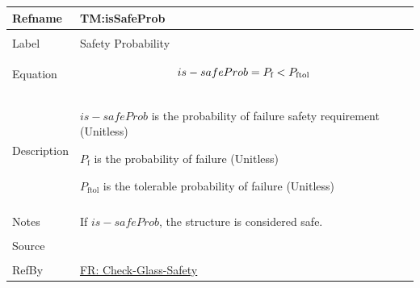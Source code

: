 \documentclass[12pt]{article}
\newcommand{\lt}{\ensuremath <}
\begin{document}
\vspace{\baselineskip}
\noindent
\begin{minipage}{\textwidth}
\begin{tabular}{>{\raggedright}p{}>{\raggedright\arraybackslash}p{}}
\toprule \textbf{Refname} & \textbf{TM:isSafeProb}
\label{TM:isSafeProb}
\\ \midrule \\
Label & Safety Probability
        
\\ \midrule \\
Equation & \begin{displaymath}
           is-safeProb={P_{\text{f}}}\lt{}{P_{\text{f}\text{tol}}}
           \end{displaymath}
\\ \midrule \\
Description & \begin{symbDescription}
              \item{$is-safeProb$ is the probability of failure safety requirement (Unitless)}
              \item{${P_{\text{f}}}$ is the probability of failure (Unitless)}
              \item{${P_{\text{f}\text{tol}}}$ is the tolerable probability of failure (Unitless)}
              \end{symbDescription}
\\ \midrule \\
Notes & If $is-safeProb$, the structure is considered safe.
        
\\ \midrule \\
Source & \cite{astm2009}
         
\\ \midrule \\
RefBy & \hyperref[checkGlassSafety]{FR: Check-Glass-Safety}
        
\\ \bottomrule
\end{tabular}
\end{minipage}
\vspace{\baselineskip}
\noindent
\end{document}
